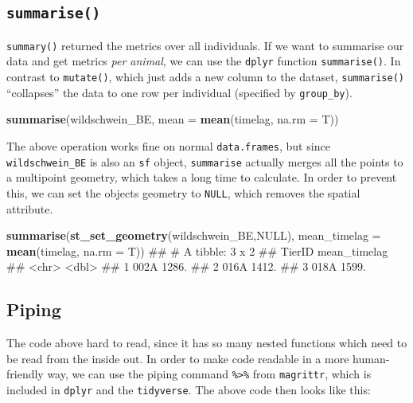 \documentclass[]{book}
\newenvironment{Shaded}{\begin{snugshade}}{\end{snugshade}}
\newcommand{\KeywordTok}[1]{\textcolor[rgb]{0.13,0.29,0.53}{\textbf{#1}}}
\newcommand{\DataTypeTok}[1]{\textcolor[rgb]{0.13,0.29,0.53}{#1}}
\newcommand{\OtherTok}[1]{\textcolor[rgb]{0.56,0.35,0.01}{#1}}
\newcommand{\NormalTok}[1]{#1}
\begin{document}
\subsection{\texorpdfstring{\texttt{summarise()}}{summarise()}}\label{summarise}

\texttt{summary()} returned the metrics over all individuals. If we want
to summarise our data and get metrics \emph{per animal}, we can use the
\texttt{dplyr} function \texttt{summarise()}. In contrast to
\texttt{mutate()}, which just adds a new column to the dataset,
\texttt{summarise()} ``collapses'' the data to one row per individual
(specified by \texttt{group\_by}).

\begin{Shaded}
\begin{Highlighting}[]
\KeywordTok{summarise}\NormalTok{(wildschwein_BE, }\DataTypeTok{mean =} \KeywordTok{mean}\NormalTok{(timelag, }\DataTypeTok{na.rm =}\NormalTok{ T))}
\end{Highlighting}
\end{Shaded}

The above operation works fine on normal \texttt{data.frames}, but since
\texttt{wildschwein\_BE} is also an \texttt{sf} object,
\texttt{summarise} actually merges all the points to a multipoint
geometry, which takes a long time to calculate. In order to prevent
this, we can set the objects geometry to \texttt{NULL}, which removes
the spatial attribute.

\begin{Shaded}
\begin{Highlighting}[]

\KeywordTok{summarise}\NormalTok{(}\KeywordTok{st_set_geometry}\NormalTok{(wildschwein_BE,}\OtherTok{NULL}\NormalTok{), }\DataTypeTok{mean_timelag =} \KeywordTok{mean}\NormalTok{(timelag, }\DataTypeTok{na.rm =}\NormalTok{ T))}
\NormalTok{## # A tibble: 3 x 2}
\NormalTok{##   TierID mean_timelag}
\NormalTok{##   <chr>         <dbl>}
\NormalTok{## 1 002A          1286.}
\NormalTok{## 2 016A          1412.}
\NormalTok{## 3 018A          1599.}
\end{Highlighting}
\end{Shaded}

\subsection{Piping}\label{piping}

The code above hard to read, since it has so many nested functions which
need to be read from the inside out. In order to make code readable in a
more human-friendly way, we can use the piping command
\texttt{\%\textgreater{}\%} from \texttt{magrittr}, which is included in
\texttt{dplyr} and the \texttt{tidyverse}. The above code then looks
like this:
\end{document}
